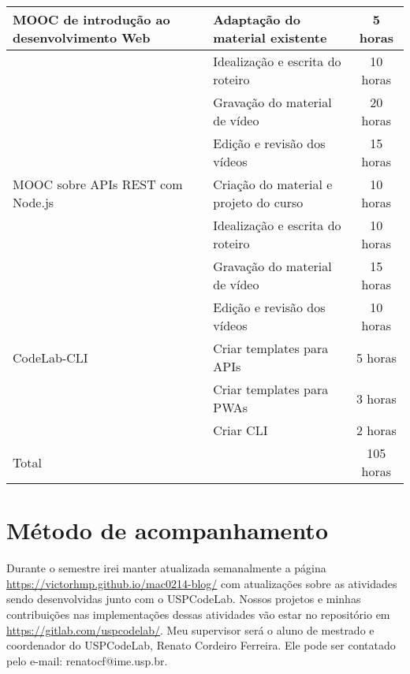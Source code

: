 \documentclass[10pt,twoside,a4paper]{article}
\begin{document}
    \begin{center}
            \begin{tabular}{ |l|l|c| } 
                \hline
                    MOOC de introdução ao desenvolvimento Web
                     & Adaptação do material existente & 5 horas \\
                     \hline
                     & Idealização e escrita do roteiro & 10 horas \\
                     \hline
                     & Gravação do material de vídeo & 20 horas \\
                     \hline
                     & Edição e revisão dos vídeos & 15 horas \\
                \hline
                    MOOC sobre APIs REST com Node.js
                     & Criação do material e projeto do curso & 10 horas \\
                     \hline
                     & Idealização e escrita do roteiro & 10 horas \\
                     \hline
                     & Gravação do material de vídeo &  15 horas \\
                     \hline
                     & Edição e revisão dos vídeos &  10 horas \\
                \hline
                    CodeLab-CLI
                     & Criar templates para APIs & 5 horas \\
                     \hline
                     & Criar templates para PWAs  & 3 horas \\
                     \hline
                     & Criar CLI & 2 horas \\
                
                \hline
                    Total
                    & & 105 horas \\
                \hline
            \end{tabular}
    \end{center}

\section{Método de acompanhamento}

    Durante o semestre irei manter atualizada semanalmente a página \url{https://victorhmp.github.io/mac0214-blog/} com atualizações sobre as atividades sendo desenvolvidas junto com o USPCodeLab. Nossos projetos e minhas contribuições nas implementações dessas atividades vão estar no repositório em \url{https://gitlab.com/uspcodelab/}.
    Meu supervisor será o aluno de mestrado e coordenador do USPCodeLab, Renato Cordeiro Ferreira. Ele pode ser contatado pelo e-mail: renatocf@ime.usp.br.
\end{document}
